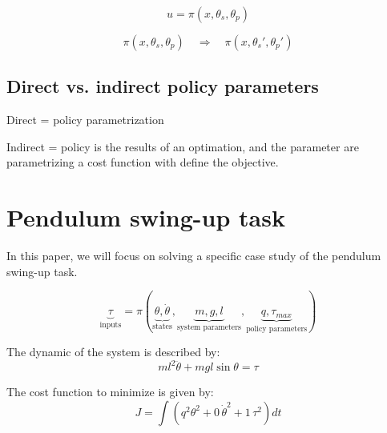 \begin{equation}
u
=
\pi \left(
x,
\theta_s,
\theta_p
\right)
\end{equation}




\begin{equation}
\pi \left(
x,
\theta_s,
\theta_p
\right)
\quad \Rightarrow \quad
\pi \left(
x,
\theta_s',
\theta_p'
\right)
\end{equation}

\subsection{Direct vs. indirect policy parameters}

Direct = policy parametrization

Indirect = policy is the results of an optimation, and the parameter are parametrizing a cost function with define the objective.



\newpage
\section{Pendulum swing-up task}
In this paper, we will focus on solving a specific case study of the pendulum swing-up task. 

\begin{equation}
\underbrace{\tau}_{\text{inputs}}
=
\pi \left(
\underbrace{ \theta, \dot{\theta} }_{\text{states}},
\underbrace{ m , g , l }_{\text{system parameters}},
\underbrace{ q , \tau_{max} }_{\text{policy parameters}}
\right)
\end{equation}

The dynamic of the system is described by:
\begin{equation}
ml^2 \ddot{\theta} + mgl \sin \theta = \tau
\end{equation}

The cost function to minimize is given by:
\begin{equation}
J = \int{( q^2 \theta^2 + 0 \, \dot{\theta}^2 + 1 \, \tau^2 ) dt }
\end{equation}

